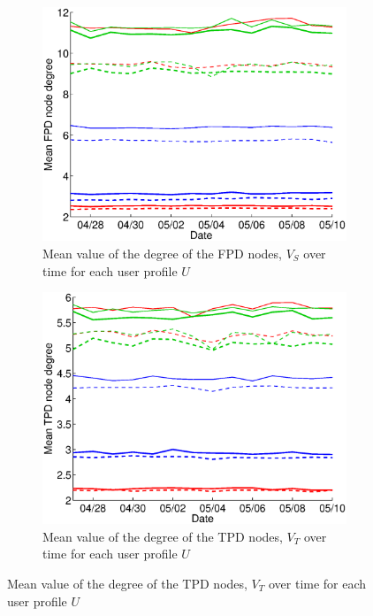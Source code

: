 \documentclass{sig-alternate}
\begin{document}
    \begin{figure}
   \centering
   
   \begin{subfigure}{.45\textwidth}
    \includegraphics[width=\textwidth]{figures/plots/first-means-entities.eps}
    \caption{Mean value of the degree of the FPD nodes, $V_S$ over time for each user profile $U$}
    \label{fig:first_means_entities}
  \end{subfigure}
  
  \begin{subfigure}{.45\textwidth}
    \includegraphics[width=\textwidth]{figures/plots/third-means-entities.eps}
    \caption{Mean value of the degree of the TPD nodes, $V_T$ over time for each user profile $U$}
    \label{fig:third_means_entities}
  \end{subfigure}


\end{figure}
\end{document}
